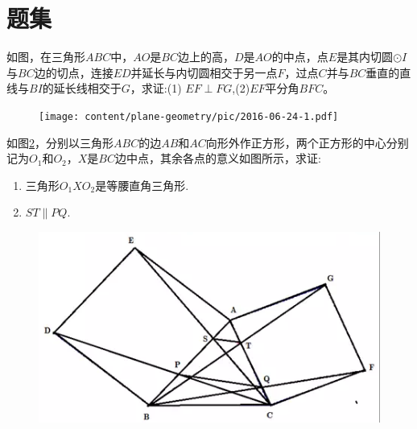 
\section{题集}

\begin{exercise}
\label{exercise:2016-06-24-1}
  如图，在三角形$ABC$中，$AO$是$BC$边上的高，$D$是$AO$的中点，点$E$是其内切圆$\odot I$与$BC$边的切点，连接$ED$并延长与内切圆相交于另一点$F$，过点$C$并与$BC$垂直的直线与$BI$的延长线相交于$G$，求证:(1) $EF \perp FG$,(2)$EF$平分角$BFC$。
\end{exercise}
\begin{figure}[htbp]
  \centering
\texttt{[image: content/plane-geometry/pic/2016-06-24-1.pdf]}
\caption{}
\label{fig:2016-06-24-1}
\end{figure}

\begin{exercise}
  如图\ref{fig:2017-02-09-01-01}，分别以三角形$ABC$的边$AB$和$AC$向形外作正方形，两个正方形的中心分别记为$O_{1}$和$O_{2}$，$X$是$BC$边中点，其余各点的意义如图所示，求证:
  \begin{enumerate}
  \item 三角形$O_{1}XO_{2}$是等腰直角三角形.
  \item $ST \parallel PQ$.
  \end{enumerate}
\end{exercise}

\begin{figure}[htbp]
  \centering
\includegraphics[scale=0.6]{content/plane-geometry/pic/2017-02-09-01-01.png}
\caption{}
\label{fig:2017-02-09-01-01}
\end{figure}
  
